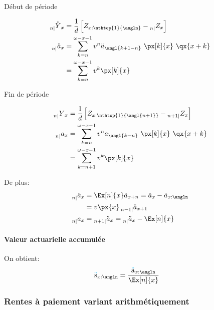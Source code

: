 \documentclass[10pt, french]{article}
\newcommand\cumlaut[2][black]{\stackon[.33ex]{#2}{\textcolor{#1}{\kern-.04ex.\kern-.2ex.}}}
\begin{document}
\begin{multicols*}{3}
\setlength{\mathindent}{-1cm}
\begin{minipage}[t]{0.5\columnwidth}
\begin{center}
Début de période
\end{center}
\begin{align*}
	\prescript{}{n|}{\ddot{Y}}_{x}
	&=	\frac{1}{d} \left[ Z_{x:\nthtop{1}{\angln}} - \prescript{}{n|}{Z_{x}} \right]	\\
	\prescript{}{n|}{\ddot{a}}_{x}	
	&=	\sum_{k = n}^{\omega - x - 1} v^{n} \ddot{a}_{\angl{k + 1 - n}} \ \px[k]{x} \ \qx{x + k}	\\
	&=	\sum_{k = n}^{\omega - x - 1} v^{k} \px[k]{x}
\end{align*}
\end{minipage}
\begin{minipage}[t]{0.5\columnwidth}
\begin{center}
Fin de période
\end{center}
\begin{align*}
	\prescript{}{n|}{Y}_{x}
	&=	\frac{1}{d} \left[ Z_{x:\nthtop{1}{\angl{n + 1}}} - \prescript{}{n + 1|}{Z_{x}} \right]	\\
	\prescript{}{n|}{a}_{x}
	&=	\sum_{k = n}^{\omega - x - 1} v^{n} a_{\angl{k - n}} \ \px[k]{x} \ \qx{x + k}	\\
	&=	\sum_{k = n + 1}^{\omega - x - 1} v^{k} \px[k]{x}
\end{align*}	
\end{minipage}
\setlength{\mathindent}{1cm}

De plus:
\begin{align*}
	\prescript{}{n|}{\ddot{a}}_{x}
	&=	\Ex[n]{x} \ddot{a}_{x + n}	
	=	\ddot{a}_{x} - \ddot{a}_{x:\angln}	\\
	&=	v \px{x} \prescript{}{n - 1|}{\ddot{a}}_{x + 1}	\\
	\prescript{}{n|}{a}_{x}
	&=	\prescript{}{n + 1|}{\ddot{a}}_{x}
	=	\prescript{}{n|}{\ddot{a}}_{x} - \Ex[n]{x}
\end{align*}

\paragraph{Valeur actuarielle accumulée}

On obtient:
\begin{align*}
	\cumlaut[cyan]{s}_{x:\angln}
	&=	\frac{\cumlaut[cyan]{a}_{x:\angln}}{\Ex[n]{x}}	
\end{align*}
	
\subsubsection*{\textcolor{amber(sae/ece)}{Rentes à paiement variant arithmétiquement}}


\end{multicols*}
\end{document}
